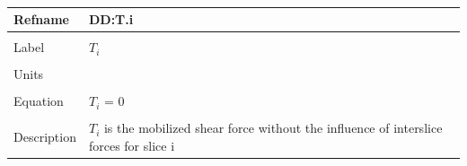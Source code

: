 \documentclass[12pt]{article}
\begin{document}
~\newline
\noindent \begin{minipage}{\textwidth}
\begin{tabular}{p{} p{}}
\toprule \textbf{Refname} & \textbf{DD:T.i}
\label{DD:T.i}
\\ \midrule \\
Label & $T_{i}$
\\ \midrule \\
Units & 
\\ \midrule \\
Equation & $T_{i}$ = $0$
\\ \midrule \\
Description & $T_{i}$ is the mobilized shear force without the influence of interslice forces for slice i
\\ \bottomrule \end{tabular}
\end{minipage}\\
\end{document}
